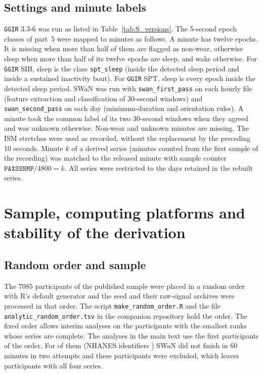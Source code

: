 \documentclass[12pt]{article}
\begin{document}
\subsection{Settings and minute labels}
\texttt{GGIR} 3.3-6 was run as listed in Table~\ref{tab:S_versions}. The 5-second epoch classes of part~5 were mapped to minutes as follows. A minute has twelve epochs. It is missing when more than half of them are flagged as non-wear, otherwise sleep when more than half of its twelve epochs are sleep, and wake otherwise. For \texttt{GGIR} SIB, sleep is the class \texttt{spt\_sleep} (inside the detected sleep period and inside a sustained inactivity bout). For \texttt{GGIR} SPT, sleep is every epoch inside the detected sleep period. SWaN was run with \texttt{swan\_first\_pass} on each hourly file (feature extraction and classification of 30-second windows) and \texttt{swan\_second\_pass} on each day (minimum-duration and orientation rules). A minute took the common label of its two 30-second windows when they agreed and was unknown otherwise. Non-wear and unknown minutes are missing. The ISM stretches were used as recorded, without the replacement by the preceding 10 seconds. Minute $k$ of a derived series (minutes counted from the first sample of the recording) was matched to the released minute with sample counter $\texttt{PAXSSNMP}/4800 = k$. All series were restricted to the days retained in the rebuilt series.

\section{Sample, computing platforms and stability of the derivation}
\label{sec:S_platforms}
\subsection{Random order and sample}
The 7085 participants of the published sample were placed in a random order with R's default generator and the seed \rawSeed{} and their raw-signal archives were processed in that order. The script \texttt{make\_random\_order.R} and the file \texttt{analytic\_random\_order.tsv} in the companion repository hold the order. The fixed order allows interim analyses on the participants with the smallest ranks whose series are complete. The analyses in the main text use the first \rawPrefixR{} participants of the order. For \rawNexcl{} of them (NHANES identifiers \rawExclSeqn) SWaN did not finish in 60 minutes in two attempts and these participants were excluded, which leaves \rawNsample{} participants with all four series.
\end{document}
